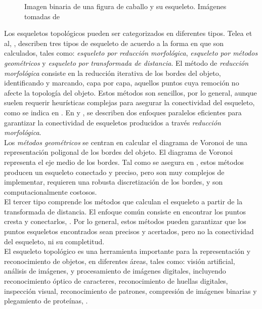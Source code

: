 \begin{figure}[h t b p ! H]
  \centering
\qquad
  \caption[Imagen binaria y esqueleto topol\'ogico de una figura de caballo]{Imagen binaria de una figura de
caballo y su esqueleto. Im\'agenes tomadas de \cite{ssm}}
  \label{fig:genskeleton}
\end{figure}


Los esqueletos topol\'ogicos pueden ser categorizados en diferentes tipos.
Telea et al, \cite{augmented}, describen tres tipos de esqueleto de acuerdo a la forma en que
son calculados, tales como: \emph{esqueleto por reducci\'on morfol\'ogica}, 
\emph{esqueleto por m\'etodos geom\'etricos} y \emph{esqueleto por transformada de distancia}.
El m\'etodo de \emph{reducci\'on morfol\'ogica} consiste en la reducci\'on iterativa de los bordes
del objeto, identificando y marcando, capa por capa, aquellos puntos cuya remoci\'on no afecte
la topolog\'ia del objeto. Estos m\'etodos son sencillos, por lo general, aunque suelen requerir
heur\'isticas complejas para asegurar la conectividad del esqueleto, como se indica en
\cite{augmented}. En \cite{onepass} y \cite{thinning}, se describen dos enfoques paralelos
eficientes para garantizar la conectividad de esqueletos producidos a trav\'es 
\emph{reducci\'on morfol\'ogica}.\\
Los \emph{m\'etodos geom\'etricos} se centran en calcular el diagrama de Voronoi de una
representaci\'on poligonal de los bordes del objeto. El diagrama de Voronoi representa
el eje medio de los bordes. Tal como se asegura en \cite[p.251]{augmented}, estos m\'etodos
producen un esqueleto conectado y preciso, pero son muy complejos de implementar, requieren
una robusta discretizaci\'on de los bordes, y son computacionalmente costosos.\\
El tercer tipo comprende los m\'etodos que calculan el esqueleto a partir de 
la transformada de distancia. El enfoque com\'un consiste en encontrar los puntos cresta
y conectarlos, \cite{maxima, euclideancentre, ridgedt}. Por lo general, estos m\'etodos
pueden garantizar que los puntos esqueletos encontrados sean precisos y acertados, 
pero no la conectividad del esqueleto, ni su completitud.\\

El esqueleto topol\'ogico es una herramienta importante para la representaci\'on
y reconocimiento de objetos, en diferentes \'areas, tales como: visi\'on artificial,
an\'alisis de im\'agenes, y procesamiento de im\'agenes digitales, incluyendo 
reconocimiento \'optico de caracteres, reconocimiento de huellas digitales, inspecci\'on
visual, reconocimiento de patrones, compresi\'on de im\'agenes binarias y plegamiento
de prote\'inas, \cite{skprotein}.


